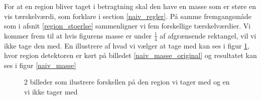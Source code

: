 For at en region bliver taget i betragtning skal den have en masse som
er støre en vis tærskelværdi, som forklare i section \ref{naiv_regler}. På samme
fremgangsmåde som i afsnit \ref{region_stoerlse} sammenligner vi fem
forskellige tærskelværdier. Vi kommer frem til at hvis figurens masse er
under $\frac{1}{4}$ af afgrænsende rektangel, vil vi ikke tage den
med. En illustrere af hvad vi vælger at tage med kan ses i figur
\ref{masse}, hvor region detektoren er kørt på billedet
\ref{naiv_masse_original} og resultatet kan ses i figur \ref{naiv_masse}

\begin{figure}[!h]
    \centering
		\hspace{1em}
	    \hspace{1em}
		\label{masse}
		\caption{2 billeder som ilustrere forskellen på den region vi tager med og en vi ikke tager med}
\end{figure}
